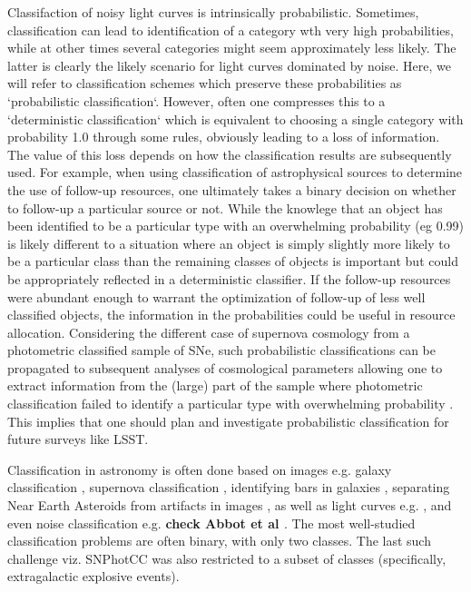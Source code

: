 Classifaction of noisy light curves is intrinsically probabilistic.
Sometimes, classification can lead to identification of a category wth very high probabilities, while at other times several categories might seem approximately less likely. The latter is clearly the likely scenario for light curves dominated by noise.
Here, we will refer to classification schemes which preserve these probabilities as `probabilistic classification`.
However, often one compresses this to a `deterministic classification` which is equivalent to choosing a single category with probability 1.0 through some rules, obviously leading to a loss of information.
The value of this loss depends on how the classification results are subsequently used.
For example, when using classification of astrophysical sources to determine the use of follow-up resources, one ultimately takes a binary decision on whether to follow-up a particular source or not.
While the knowlege that an object has been identified to be a particular type with an overwhelming probability (eg 0.99) is likely different to a situation where an object is simply slightly more likely to be a particular class than the remaining classes of objects is important but could be appropriately reflected in a deterministic classifier.
If the follow-up resources were abundant enough to warrant the optimization of follow-up of less well classified objects, the information in the probabilities could be useful in resource allocation.
Considering the different case of supernova cosmology from a photometric classified sample of SNe, such probabilistic classifications can be propagated to subsequent analyses of cosmological parameters allowing one to extract information from the (large) part of the sample where photometric classification failed to identify a particular type with overwhelming probability \cite{roberts_zbeams:_2017}.
This implies that one should plan and investigate probabilistic classification for future surveys like LSST.

Classification in astronomy is often done based on images e.g. galaxy classification \cite{2016A&C....16...34H}, supernova classification \cite{2017ApJ...836...97C}, identifying bars in galaxies \cite{2018MNRAS.477..894A}, separating Near Earth Asteroids from artifacts in images \cite{2016PASJ...68..104M}, as well as light curves e.g. \cite{2016PASJ...68..104M,2017arXiv170906257M,2017CQGra..34f4003Z}, and even noise classification e.g. \textbf{check Abbot et al \cite{2017CQGra..34f4003Z, 2018PhRvD..97j1501G}}.
The most well-studied classification problems are often binary, with only two classes.
The last such challenge viz. SNPhotCC was also restricted to a subset of classes (specifically, extragalactic explosive events).

